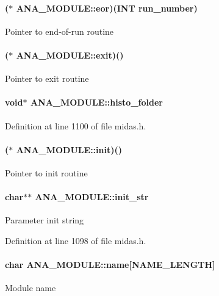\paragraph[{eor}]{($\ast$ {\bf ANA\_\-MODULE::eor})({\bf INT} {\bf run\_\-number})}\hfill\label{structANA__MODULE_ab6b3f976d916f185922ed4ccfe6453c6}
Pointer to end-\/of-\/run routine 
\paragraph[{exit}]{($\ast$ {\bf ANA\_\-MODULE::exit})()}\hfill\label{structANA__MODULE_af3b4cc4d6a12a8eadeea80d82866b780}
Pointer to exit routine 
\paragraph[{histo\_\-folder}]{\setlength{\rightskip}{0pt plus 5cm}void$\ast$ {\bf ANA\_\-MODULE::histo\_\-folder}}\hfill\label{structANA__MODULE_ac8ee8336d73fa16f3e17a1192e1a6466}


Definition at line 1100 of file midas.h.
\paragraph[{init}]{($\ast$ {\bf ANA\_\-MODULE::init})()}\hfill\label{structANA__MODULE_a8ae1120805260da00f37f34ed6d519c5}
Pointer to init routine 
\paragraph[{init\_\-str}]{\setlength{\rightskip}{0pt plus 5cm}char$\ast$$\ast$ {\bf ANA\_\-MODULE::init\_\-str}}\hfill\label{structANA__MODULE_a4b8d333bfed34726eca0311247b0ad4e}
Parameter init string 

Definition at line 1098 of file midas.h.
\paragraph[{name}]{\setlength{\rightskip}{0pt plus 5cm}char {\bf ANA\_\-MODULE::name}\mbox{[}NAME\_\-LENGTH\mbox{]}}\hfill\label{structANA__MODULE_a2d2f552fa5363f29a073f6e474e2f4f2}
Module name 


